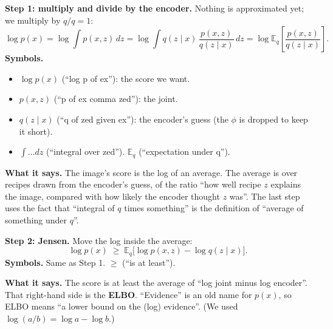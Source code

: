\textbf{Step 1: multiply and divide by the encoder.} Nothing is approximated yet; we multiply by $q/q = 1$:
\[
\log p(x) = \log \int p(x, z)\, dz
= \log \int q(z \mid x)\,\frac{p(x, z)}{q(z \mid x)}\, dz
= \log \mathbb{E}_{q}\!\left[ \frac{p(x, z)}{q(z \mid x)} \right].
\]
\textbf{Symbols.}
\begin{itemize}[leftmargin=1.5em, itemsep=0pt]
\item $\log p(x)$ (``log p of ex''): the score we want.
\item $p(x, z)$ (``p of ex comma zed''): the joint.
\item $q(z \mid x)$ (``q of zed given ex''): the encoder's guess (the $\phi$ is dropped to keep it short).
\item $\int \ldots dz$ (``integral over zed''). $\mathbb{E}_q$ (``expectation under q'').
\end{itemize}
\textbf{What it says.} The image's score is the log of an average. The average is over recipes drawn from the encoder's guess, of the ratio ``how well recipe $z$ explains the image, compared with how likely the encoder thought $z$ was''. The last step uses the fact that ``integral of $q$ times something'' is the definition of ``average of something under $q$''.

\textbf{Step 2: Jensen.} Move the log inside the average:
\[
\log p(x) \;\ge\; \mathbb{E}_{q}\big[\log p(x, z) - \log q(z \mid x)\big].
\]
\textbf{Symbols.} Same as Step 1. $\ge$ (``is at least'').

\textbf{What it says.} The score is at least the average of ``log joint minus log encoder''. That right-hand side is the \textbf{ELBO}. ``Evidence'' is an old name for $p(x)$, so ELBO means ``a lower bound on the (log) evidence''. (We used $\log(a/b) = \log a - \log b$.)

